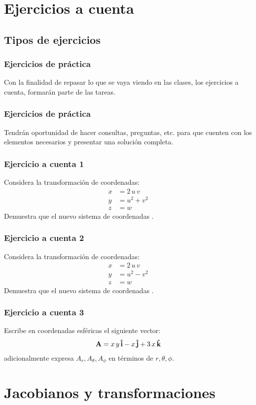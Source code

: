 \documentclass[12pt]{beamer}
\begin{document}
\section{Ejercicios a cuenta}
\subsection{Tipos de ejercicios}

\begin{frame}
\frametitle{Ejercicios de práctica}
Con la finalidad de repasar lo que se vaya viendo en las clases, los ejercicios a cuenta, formarán parte de las tareas.
\end{frame}
\begin{frame}
\frametitle{Ejercicios de práctica}
Tendrán oportunidad de hacer consultas, preguntas, etc. para que cuenten con los elementos necesarios y presentar una solución completa.
\end{frame}
\begin{frame}
\frametitle{Ejercicio a cuenta 1}
Considera la transformación de coordenadas:
\begin{align*}
x &= 2 \, u \, v \\[0.5em]
y &= u^{2} + v^{2} \\[0.5em]
z &= w
\end{align*}
Demuestra que el nuevo sistema de coordenadas .
\end{frame}
\begin{frame}
\frametitle{Ejercicio a cuenta 2}
Considera la transformación de coordenadas:
\begin{align*}
x &= 2 \, u \, v \\[0.5em]
y &= u^{2} - v^{2} \\[0.5em]
z &= w
\end{align*}
Demuestra que el nuevo sistema de coordenadas .
\end{frame}
\begin{frame}
\frametitle{Ejercicio a cuenta 3}
Escribe en coordenadas esféricas el siguiente vector:
\begin{align*}
\vb{A} = x \, y \, \vu{i} - x \, \vu{j} + 3 \, x \, \vu{k}
\end{align*}
adicionalmente expresa $A_{r}, A_{\theta}, A_{\phi}$ en términos de $r, \theta, \phi$.
\end{frame}

\section{Jacobianos y transformaciones}
\end{document}
